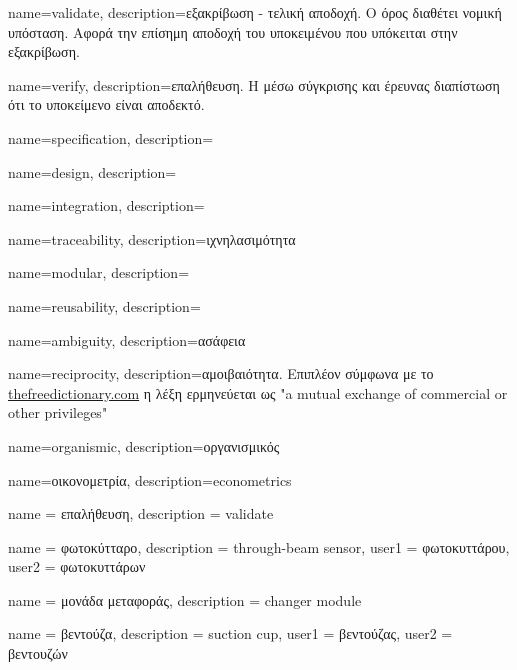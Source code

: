 
	{name={validate}, description={εξακρίβωση - τελική αποδοχή. Ο όρος διαθέτει νομική υπόσταση. Αφορά την επίσημη αποδοχή του υποκειμένου που υπόκειται στην εξακρίβωση.}}

	{name={verify}, description={επαλήθευση. Η μέσω σύγκρισης και έρευνας διαπίστωση ότι το υποκείμενο είναι αποδεκτό.}}
	
	{name={specification}, description={}}
	
	{name={design}, description={}}
	
	{name={integration}, description={}}

	{name={traceability}, description={ιχνηλασιμότητα}}

	{name={modular}, description={}}
	
	{name={reusability}, description={}}
	
	{name={ambiguity}, description={ασάφεια}}
	
	{name={reciprocity}, description={αμοιβαιότητα. Επιπλέον σύμφωνα με το \href{http://www.thefreedictionary.com/reciprocity}{thefreedictionary.com} η λέξη ερμηνεύεται ως "a mutual exchange of commercial or other privileges"}}
	
	{name={organismic}, description={οργανισμικός}
	}
	
	{name={οικονομετρία}, description={econometrics}
	}

	{name			= {επαλήθευση},
	 description		= {validate}
	}
	
	{name			= {φωτοκύτταρο},
	 description	= {through-beam sensor},
	 user1			= {φωτοκυττάρου},
	 user2			= {φωτοκυττάρων}
	}
	
	{name			= {μονάδα μεταφοράς},
	 description	= {changer module}
	}
	
	{name			= {βεντούζα},
	 description	= {suction cup},
	 user1			= {βεντούζας},
	 user2			= {βεντουζών}
	}
	
